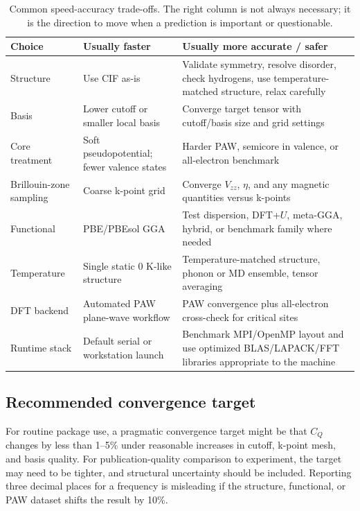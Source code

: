 \documentclass[11pt]{article}
\newcommand{\CQ}{C_Q}
\newcommand{\Vzz}{V_{zz}}
\newcommand{\etaEFG}{\eta}
\begin{document}
\begin{table}[H]
\centering
\small
\begin{tabularx}{\textwidth}{L{0.22\textwidth}Y Y}
\toprule
\textbf{Choice} & \textbf{Usually faster} & \textbf{Usually more accurate / safer} \\
\midrule
Structure & Use CIF as-is & Validate symmetry, resolve disorder, check hydrogens, use temperature-matched structure, relax carefully \\
Basis & Lower cutoff or smaller local basis & Converge target tensor with cutoff/basis size and grid settings \\
Core treatment & Soft pseudopotential; fewer valence states & Harder PAW, semicore in valence, or all-electron benchmark \\
Brillouin-zone sampling & Coarse k-point grid & Converge $\Vzz$, $\etaEFG$, and any magnetic quantities versus k-points \\
Functional & PBE/PBEsol GGA & Test dispersion, DFT+$U$, meta-GGA, hybrid, or benchmark family where needed \\
Temperature & Single static 0 K-like structure & Temperature-matched structure, phonon or MD ensemble, tensor averaging \\
DFT backend & Automated PAW plane-wave workflow & PAW convergence plus all-electron cross-check for critical sites \\
Runtime stack & Default serial or workstation launch & Benchmark MPI/OpenMP layout and use optimized BLAS/LAPACK/FFT libraries appropriate to the machine \\
\bottomrule
\end{tabularx}
\caption{Common speed-accuracy trade-offs.  The right column is not always necessary; it is the direction to move when a prediction is important or questionable.}
\label{tab:tradeoffs}
\end{table}

\subsection{Recommended convergence target}

For routine package use, a pragmatic convergence target might be that $\CQ$ changes by less than 1--5\% under reasonable increases in cutoff, k-point mesh, and basis quality.  For publication-quality comparison to experiment, the target may need to be tighter, and structural uncertainty should be included.  Reporting three decimal places for a frequency is misleading if the structure, functional, or PAW dataset shifts the result by 10\%.
\end{document}
